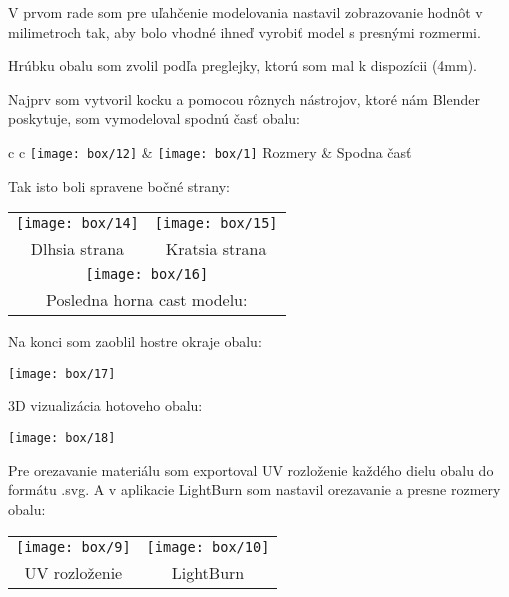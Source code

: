         V prvom rade som pre uľahčenie modelovania nastavil zobrazovanie hodnôt v milimetroch tak, aby bolo vhodné ihneď vyrobiť model s presnými rozmermi.

        Hrúbku obalu som zvolil podľa preglejky, ktorú som mal k dispozícii (4mm).

        Najprv som vytvoril kocku a pomocou rôznych nástrojov, ktoré nám Blender poskytuje, som vymodeloval spodnú časť obalu:

        \begin{tabular}{c c}
          \texttt{[image: box/12]} &  \texttt{[image: box/1]}
          Rozmery & Spodna časť \\
        \end{tabular}

        Tak isto boli spravene bočné strany: \\

        \begin{tabular}{c c}
          \texttt{[image: box/14]} & \texttt{[image: box/15]} \\
          Dlhsia strana & Kratsia strana \\
          \multicolumn{2}{c}{\texttt{[image: box/16]}} \\
          \multicolumn{2}{c}{Posledna horna cast modelu:}
        \end{tabular}

        Na konci som zaoblil hostre okraje obalu: \\

        \begin{center}
          \texttt{[image: box/17]}
        \end{center}

        3D vizualizácia hotoveho obalu: \\

        \begin{center}
          \texttt{[image: box/18]}
        \end{center}

        Pre orezavanie materiálu som exportoval UV rozloženie každého dielu obalu do formátu .svg. A v aplikacie LightBurn som nastavil orezavanie a presne rozmery obalu:

        \begin{tabular}{c c}
          \texttt{[image: box/9]} & \texttt{[image: box/10]} \\
          UV rozloženie & LightBurn \\
        \end{tabular}

